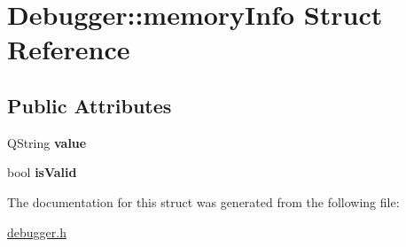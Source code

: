 \hypertarget{struct_debugger_1_1memory_info}{}\section{Debugger\+:\+:memory\+Info Struct Reference}
\label{struct_debugger_1_1memory_info}
\subsection*{Public Attributes}
\begin{DoxyCompactItemize}
\item 
\hypertarget{struct_debugger_1_1memory_info_a051ff2fda1d5faa1a188a5e2f3b5b495}{}Q\+String {\bfseries value}\label{struct_debugger_1_1memory_info_a051ff2fda1d5faa1a188a5e2f3b5b495}

\item 
\hypertarget{struct_debugger_1_1memory_info_acf5f4ed0173ad512eece40a70e2095b9}{}bool {\bfseries is\+Valid}\label{struct_debugger_1_1memory_info_acf5f4ed0173ad512eece40a70e2095b9}

\end{DoxyCompactItemize}


The documentation for this struct was generated from the following file\+:\begin{DoxyCompactItemize}
\item 
\hyperlink{debugger_8h}{debugger.\+h}\end{DoxyCompactItemize}
